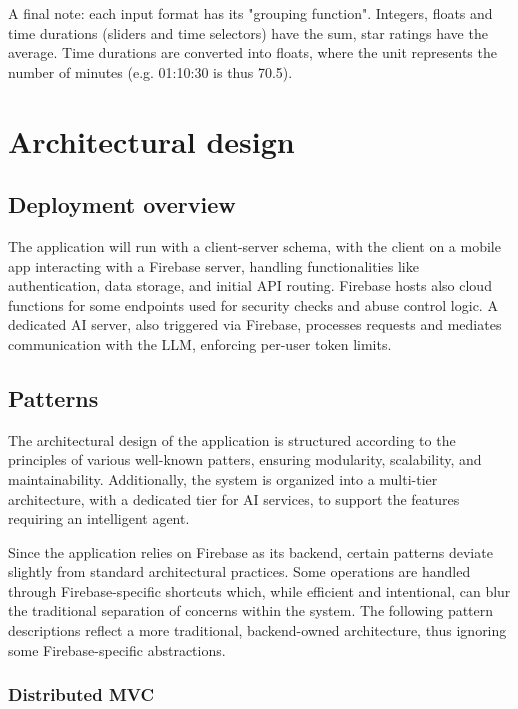 \documentclass{article}
\begin{document}
A final note: each input format has its "grouping function".
Integers, floats and time durations (sliders and time selectors) have the sum, star ratings have the average.
Time durations are converted into floats, where the unit represents the number of minutes (e.g. 01:10:30 is thus 70.5).

\newpage
\section{Architectural design}

\subsection{Deployment overview}

The application will run with a client-server schema, with the client on a mobile app interacting with a Firebase server, handling functionalities like authentication, data storage, and initial API routing.
Firebase hosts also cloud functions for some endpoints used for security checks and abuse control logic.
A dedicated AI server, also triggered via Firebase, processes requests and mediates communication with the LLM, enforcing per-user token limits.

\subsection{Patterns}

The architectural design of the application is structured according to the principles of various well-known patters, ensuring modularity, scalability, and maintainability.
Additionally, the system is organized into a multi-tier architecture, with a dedicated tier for AI services, to support the features requiring an intelligent agent.

Since the application relies on Firebase as its backend, certain patterns deviate slightly from standard architectural practices.
Some operations are handled through Firebase-specific shortcuts which, while efficient and intentional, can blur the traditional separation of concerns within the system.
The following pattern descriptions reflect a more traditional, backend-owned architecture, thus ignoring some Firebase-specific abstractions.

\subsubsection{Distributed MVC}
\end{document}
